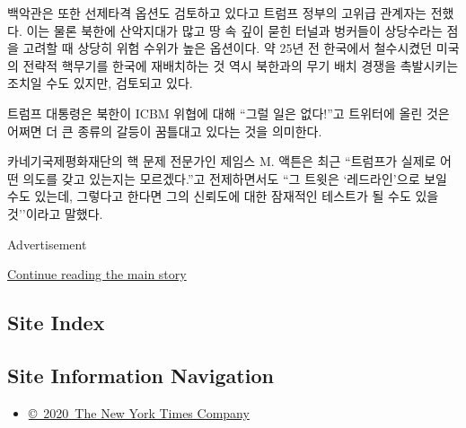 백악관은 또한 선제타격 옵션도 검토하고 있다고 트럼프 정부의 고위급
관계자는 전했다. 이는 물론 북한에 산악지대가 많고 땅 속 깊이 묻힌 터널과
벙커들이 상당수라는 점을 고려할 때 상당히 위험 수위가 높은 옵션이다. 약
25년 전 한국에서 철수시켰던 미국의 전략적 핵무기를 한국에 재배치하는 것
역시 북한과의 무기 배치 경쟁을 촉발시키는 조치일 수도 있지만, 검토되고
있다.

트럼프 대통령은 북한이 ICBM 위협에 대해 ``그럴 일은 없다!''고 트위터에
올린 것은 어쩌면 더 큰 종류의 갈등이 꿈틀대고 있다는 것을 의미한다.

카네기국제평화재단의 핵 문제 전문가인 제임스 M. 액튼은 최근 ``트럼프가
실제로 어떤 의도를 갖고 있는지는 모르겠다.''고 전제하면서도 ``그 트윗은
`레드라인'으로 보일 수도 있는데, 그렇다고 한다면 그의 신뢰도에 대한
잠재적인 테스트가 될 수도 있을 것''이라고 말했다.

Advertisement

\protect\hyperlink{after-bottom}{Continue reading the main story}

\hypertarget{site-index}{%
\subsection{Site Index}\label{site-index}}

\hypertarget{site-information-navigation}{%
\subsection{Site Information
Navigation}\label{site-information-navigation}}

\begin{itemize}
\tightlist
\item
  \href{https://help.nytimes.com/hc/en-us/articles/115014792127-Copyright-notice}{©~2020~The
  New York Times Company}
\end{itemize}

